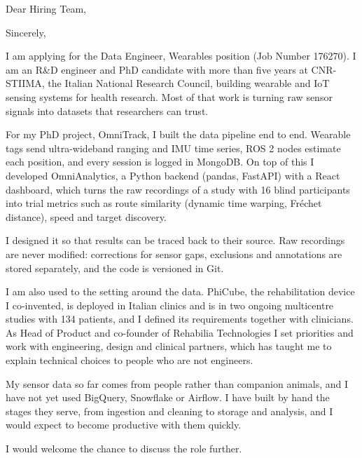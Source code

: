 \documentclass[11pt,a4paper,sans]{moderncv}
\begin{document}

\opening{Dear Hiring Team,}
\closing{Sincerely,}
\makelettertitle

I am applying for the Data Engineer, Wearables position (Job Number 176270). I am an R\&D engineer and PhD candidate with more than five years at CNR-STIIMA, the Italian National Research Council, building wearable and IoT sensing systems for health research. Most of that work is turning raw sensor signals into datasets that researchers can trust.

For my PhD project, OmniTrack, I built the data pipeline end to end. Wearable tags send ultra-wideband ranging and IMU time series, ROS 2 nodes estimate each position, and every session is logged in MongoDB. On top of this I developed OmniAnalytics, a Python backend (pandas, FastAPI) with a React dashboard, which turns the raw recordings of a study with 16 blind participants into trial metrics such as route similarity (dynamic time warping, Fr\'echet distance), speed and target discovery.

I designed it so that results can be traced back to their source. Raw recordings are never modified: corrections for sensor gaps, exclusions and annotations are stored separately, and the code is versioned in Git.

I am also used to the setting around the data. PhiCube, the rehabilitation device I co-invented, is deployed in Italian clinics and is in two ongoing multicentre studies with 134 patients, and I defined its requirements together with clinicians. As Head of Product and co-founder of Rehabilia Technologies I set priorities and work with engineering, design and clinical partners, which has taught me to explain technical choices to people who are not engineers.

My sensor data so far comes from people rather than companion animals, and I have not yet used BigQuery, Snowflake or Airflow. I have built by hand the stages they serve, from ingestion and cleaning to storage and analysis, and I would expect to become productive with them quickly.

I would welcome the chance to discuss the role further.

\makeletterclosing
\end{document}
